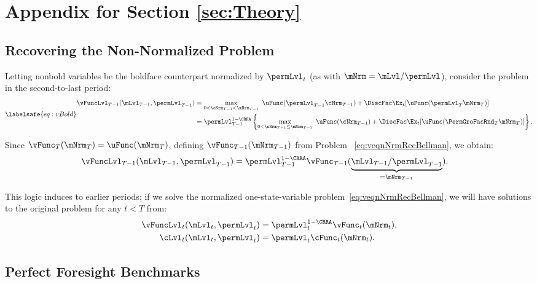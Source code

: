 \documentclass[\econtexRoot/BufferStockTheory]{subfiles}
\begin{document}
\section{Appendix for Section \ref{sec:Theory}}\label{sec:ApndxConcaveCFunc}

\subsection{Recovering the Non-Normalized Problem}\label{sec:recoverLevels}
Letting nonbold variables be the boldface counterpart normalized by $\permLvl_{t}$ (as with $\mNrm=\mLvl/\permLvl$), consider the problem in the second-to-last period:
\begin{equation}\labelsafe{eq:vBold}
  \begin{aligned}
    \vFuncLvl_{T-1}(\mLvl_{T-1},\permLvl_{T-1})
    & =  \max_{0< \cNrm_{T-1}< \mNrm_{T-1}}~
    \uFunc(\permLvl_{T-1}\cNrm_{T-1}) + \DiscFac  \Ex_{t}[\uFunc(\permLvl_{T}{\mNrm}
    _{T})]  \\
    & = \permLvl_{T-1}^{1-\CRRA}
    \left\{\max_{0<\cNrm_{T-1}\leq \mNrm_{T-1}}~ \uFunc(\cNrm_{T-1}) + \DiscFac \Ex_{t}[ \uFunc( {\PermGroFacRnd}_{T}
      {\mNrm}_{T}) ] \right\}.
  \end{aligned}
\end{equation}

\hypertarget{The-Related-Problem}{}

Since $\vFunc_{T}(\mNrm_{T}) = \uFunc(\mNrm_{T})$, defining $\vFunc_{T-1}(\mNrm_{T-1})$ from Problem ~\eqref{eq:veqnNrmRecBellman}, we obtain:
\begin{align*}
  \vFuncLvl_{T-1}(\mLvl_{T-1},\permLvl_{T-1})  & = \permLvl_{T-1}^{1-\CRRA} \vFunc_{T-1}(\underbrace{\mLvl_{T-1}/\permLvl_{T-1}}_{=\mNrm_{T-1}}).
\end{align*}

This logic induces to earlier periods; if we solve the normalized one-state-variable problem~\eqref{eq:veqnNrmRecBellman}, we will have solutions to the original problem for any $t<T$ from:
\begin{align*}
  \vFuncLvl_{t}(\mLvl_{t},\permLvl_{t})  & = \permLvl_{t}^{1-\CRRA}\vFunc_{t}(\mNrm_{t}),
  \\ \cLvl_{t}(\mLvl_{t},\permLvl_{t})  & = \permLvl_{t}\cFunc_{t}(\mNrm_{t}).
\end{align*}

\subsection{Perfect Foresight Benchmarks}\label{subsec:PFBProofs}\hypertarget{PFBProofs}{}
\end{document}
